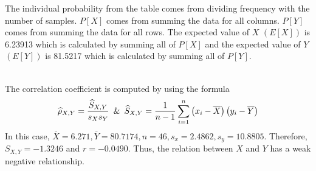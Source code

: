 The individual probability from the table comes from dividing frequency with the number of samples. $P[X]$ comes from summing the data for all columns. $P[Y]$ comes from summing the data for all rows. The expected value of $X$ $(E[X])$ is 6.23913 which is calculated by summing all of $P[X]$ and the expected value of $Y$ $(E[Y])$ is 81.5217 which is calculated by summing all of $P[Y]$.
\begin{figure}[ht!]
\end{figure}\\
The correlation coefficient is computed by using the formula 
\begin{displaymath}
    \widehat{\rho}_{X, Y} = \dfrac{\widehat{S}_{X, Y}}{s_Xs_Y} \enskip \& \enskip \widehat{S}_{X, Y}=\dfrac{1}{n-1}\displaystyle\sum\limits^n_{i=1}\left(x_i-\overline{X}\right)\left(y_i-\overline{Y}\right)
\end{displaymath}
In this case, \(\overline{X} = 6.271, \overline{Y} = 80.7174, n = 46, s_x = 2.4862, s_y = 10.8805\). Therefore, \(S_{X, Y} = -1.3246\) and \(r = -0.0490\). Thus, the relation between $X$ and $Y$ has a weak negative relationship.\newpage
